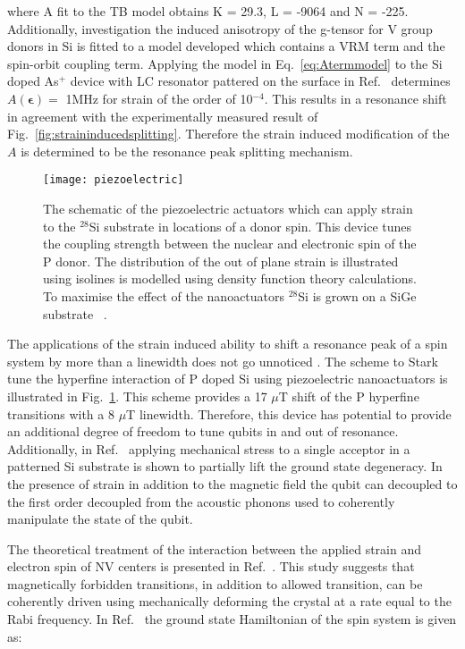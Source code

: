 where A fit to the TB model obtains K = 29.3, L = -9064 and N = -225. Additionally, investigation the induced anisotropy of the g-tensor for V group donors in Si is fitted to a model developed which contains a VRM term and the spin-orbit coupling term. Applying the model in Eq.~\ref{eq:Atermmodel} to the Si doped As$^{+}$ device with LC resonator pattered on the surface in Ref.~\citep{PhysRevApplied.9.044014} determines $A(\bm{\epsilon})=$ 1MHz for strain of the order of 10$^{-4}$. This results in a resonance shift in agreement with the experimentally measured result of Fig.~\ref{fig:straininducedsplitting}. Therefore the strain induced modification of the $A$ is determined to be the resonance peak splitting mechanism. 


\begin{figure}[h]
\centering
\texttt{[image: piezoelectric]}
\caption{\label{fig:piezoelectric} The schematic of the piezoelectric actuators which can apply strain to the $^{28}$Si substrate in locations of a donor spin. This device tunes the coupling strength between the nuclear and electronic spin of the P donor. The distribution of the out of plane strain is illustrated using isolines is modelled using density function theory calculations. To maximise the effect of the nanoactuators $^{28}$Si is grown on a SiGe substrate ~\citep{PhysRevLett.106.037601}.}
\end{figure}

The applications of the strain induced ability to shift a resonance peak of a spin system by more than a linewidth does not go unnoticed \citep{PhysRevLett.120.167701,PhysRevApplied.9.044014,PhysRevLett.115.057601}. The scheme to Stark tune the hyperfine interaction of P doped Si using piezoelectric nanoactuators is illustrated in Fig.~\ref{fig:piezoelectric}. This scheme provides a 17 $\mu$T shift of the P hyperfine transitions with a 8 $\mu$T linewidth. Therefore, this device has potential to provide an additional degree of freedom to tune qubits in and out of resonance. Additionally, in Ref.~\citep{PhysRevB.88.064308} applying mechanical stress to a single acceptor in a patterned Si substrate is shown to partially lift the ground state degeneracy. In the presence of strain in addition to the magnetic field the qubit can decoupled to the first order decoupled from the acoustic phonons used to coherently manipulate the state of the qubit.   

The theoretical treatment of the interaction between the applied strain and electron spin of NV centers is presented in Ref.~\citep{PhysRevB.98.075201}. This study suggests that magnetically forbidden transitions, in addition to allowed transition, can be coherently driven using mechanically deforming the crystal at a rate equal to the Rabi frequency. In Ref.~\citep{PhysRevLett.111.227602} the ground state Hamiltonian of the spin system is given as:

